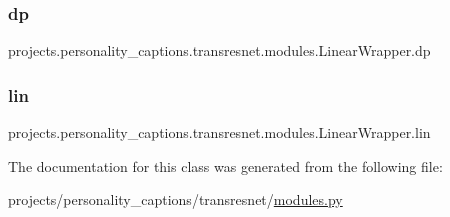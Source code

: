 \subsubsection{\texorpdfstring{dp}{dp}}
{\footnotesize\ttfamily projects.\+personality\+\_\+captions.\+transresnet.\+modules.\+Linear\+Wrapper.\+dp}

\mbox{\label{classprojects_1_1personality__captions_1_1transresnet_1_1modules_1_1LinearWrapper_a8411866655bcc0a2d1f81872d690f0bd}} 
\subsubsection{\texorpdfstring{lin}{lin}}
{\footnotesize\ttfamily projects.\+personality\+\_\+captions.\+transresnet.\+modules.\+Linear\+Wrapper.\+lin}



The documentation for this class was generated from the following file\+:\begin{DoxyCompactItemize}
\item 
projects/personality\+\_\+captions/transresnet/\hyperlink{projects_2personality__captions_2transresnet_2modules_8py}{modules.\+py}\end{DoxyCompactItemize}
